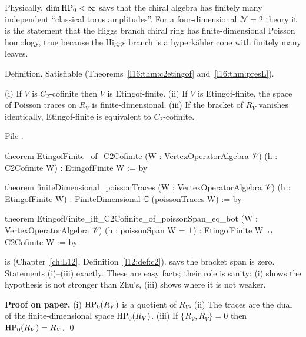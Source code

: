 \begin{physics}
Physically, $\dim\mathrm{HP}_0<\infty$ says that the chiral algebra has finitely many independent ``classical
torus amplitudes''. For a four-dimensional $\mathcal N=2$ theory it is the statement that the Higgs branch
chiral ring has finite-dimensional Poisson homology, true because the Higgs branch is a hyperk\"ahler cone with
finitely many leaves.
\end{physics}

\begin{status}
Definition. Satisfiable (Theorems~\ref{l16:thm:c2etingof} and~\ref{l16:thm:presL}).
\end{status}

\begin{theorem}\label{l16:thm:c2etingof}
(i) If $V$ is $C_2$-cofinite then $V$ is Etingof-finite. (ii) If $V$ is Etingof-finite, the space of Poisson
traces on $R_V$ is finite-dimensional. (iii) If the bracket of $R_V$ vanishes identically, Etingof-finite is
equivalent to $C_2$-cofinite.
\end{theorem}
\noindent File .
\begin{leancode}
theorem EtingofFinite_of_C2Cofinite (W : VertexOperatorAlgebra 𝒱) (h : C2Cofinite W) :
    EtingofFinite W := by

theorem finiteDimensional_poissonTraces (W : VertexOperatorAlgebra 𝒱) (h : EtingofFinite W) :
    FiniteDimensional ℂ (poissonTraces W) := by

theorem EtingofFinite_iff_C2Cofinite_of_poissonSpan_eq_bot (W : VertexOperatorAlgebra 𝒱)
    (h : poissonSpan W = ⊥) : EtingofFinite W ↔ C2Cofinite W := by
\end{leancode}

\begin{dictionary}
 is  (Chapter~\ref{ch:L12}, Definition~\ref{l12:def:c2}).
 says the bracket span is zero. Statements (i)--(iii) exactly. These are easy facts; their
role is sanity: (i) shows the hypothesis is not stronger than Zhu's, (iii) shows where it is not weaker.
\end{dictionary}

\textbf{Proof on paper.} (i) $\mathrm{HP}_0(R_V)$ is a quotient of $R_V$. (ii) The traces are the dual of the
finite-dimensional space $\mathrm{HP}_0(R_V)$. (iii) If $\{R_V,R_V\}=0$ then $\mathrm{HP}_0(R_V)=R_V$. \qed


